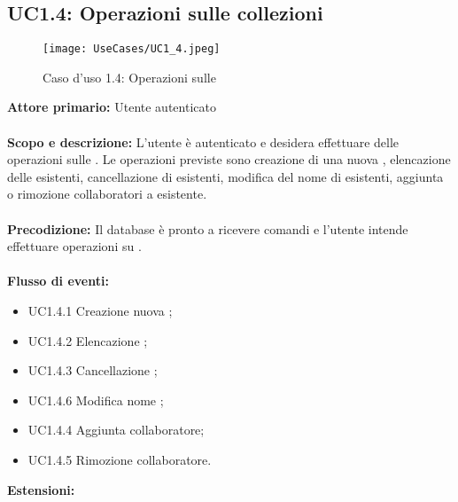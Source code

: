 \documentclass{scalatekids-article}
\begin{document}
\subsection{UC1.4: Operazioni sulle collezioni}
\begin{figure}[H]
  \begin{center}
    \texttt{[image: UseCases/UC1\_4.jpeg]}
    \caption{Caso d'uso 1.4: Operazioni sulle }
  \end{center}
\end{figure}
\textbf{Attore primario:} Utente autenticato\\ \\
\textbf{Scopo e descrizione:} L'utente è autenticato e desidera effettuare delle operazioni sulle . Le operazioni previste sono
creazione di una nuova , elencazione delle  esistenti, cancellazione di  esistenti, modifica del nome di  esistenti,
aggiunta o rimozione collaboratori a  esistente.\\ \\
\textbf{Precodizione:} Il database è pronto a ricevere comandi e l'utente intende effettuare operazioni su .\\ \\
\textbf{Flusso di eventi:}
\begin{itemize}
\item UC1.4.1 Creazione nuova ;
\item UC1.4.2 Elencazione ;
\item UC1.4.3 Cancellazione ;
\item UC1.4.6 Modifica nome ;
\item UC1.4.4 Aggiunta collaboratore;
\item UC1.4.5 Rimozione collaboratore.
\end{itemize}
\textbf{Estensioni:}
\end{document}
